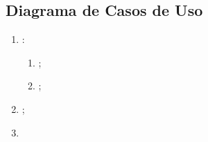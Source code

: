\subsection{Diagrama de Casos de Uso}

\begin{enumerate}
    \item \lipsum[1][1]:
    \begin{enumerate}
        \item \lipsum[1][1];
        \item \lipsum[1][1];
    \end{enumerate}
    \item \lipsum[1][1];
    \item \lipsum[1][1]
\end{enumerate}
